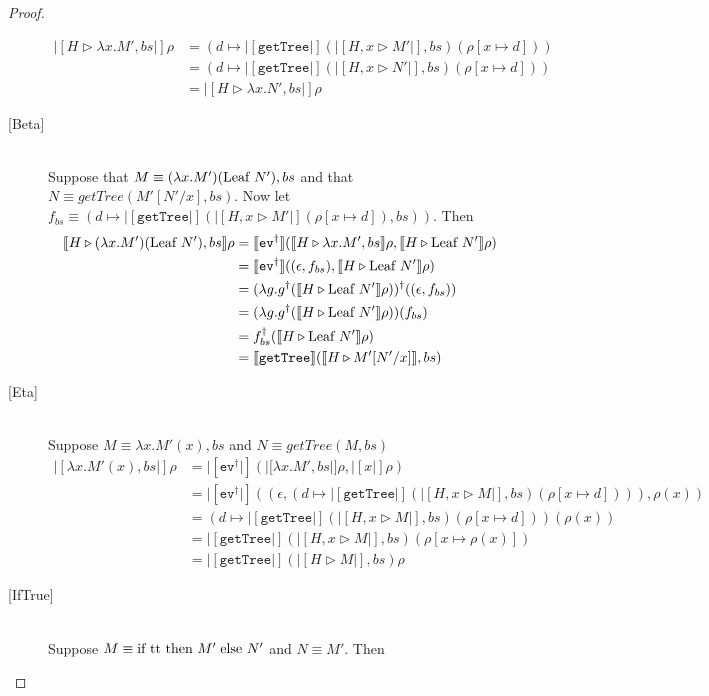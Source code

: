 \begin{proof}
\begin{description}
\begin{align*}
|[H\triangleright \lambda x.M', bs|]\rho &= 
(d\mapsto |[\texttt{getTree}|](|[H,x\triangleright M'|], bs)
(\rho[x\mapsto d])) \\
&= (d\mapsto |[\texttt{getTree}|](|[H,x\triangleright N'|], bs)
(\rho[x\mapsto d])) \\
&= |[H\triangleright \lambda x.N', bs|]\rho
\end{align*}
\item[{[}Beta{]}] \hfill \\ 
Suppose that $M\equiv (\lambda x.M')(\textrm{Leaf } N'), bs$ and that 
$N\equiv getTree(M'[N'/x],bs)$.  Now let ${f_{bs}\equiv (d\mapsto |[\texttt{getTree}|](|[H,x\triangleright M'|](\rho[x\mapsto d]), bs))}$.  Then
\begin{align*}
|[H\triangleright (\lambda x.M')(\textrm{Leaf } N'),bs|]\rho &= 
|[\texttt{ev}^\dagger|](|[H\triangleright \lambda x.M', bs|]\rho, 
|[H\triangleright \textrm{Leaf } N'|]\rho) \\
&= |[\texttt{ev}^\dagger|]((\epsilon, f_{bs}), 
|[H\triangleright \textrm{Leaf } N'|]\rho) \\
&= (\lambda g.g^{\dagger}(|[H\triangleright \textrm{Leaf } N'|]\rho))^{\dagger}
((\epsilon, f_{bs})) \\
&= (\lambda g.g^{\dagger}(|[H\triangleright \textrm{Leaf } N'|]\rho))
(f_{bs}) \\
&= f_{bs}^{\dagger}
(|[H\triangleright \textrm{Leaf } N'|]\rho) \\
&= |[\texttt{getTree}|](|[H\triangleright M'[N'/x]|], bs)
\end{align*}
\item[{[}Eta{]}] \hfill \\ 
Suppose $M\equiv \lambda x.M'(x), bs$ and 
$N\equiv getTree(M, bs)$
\begin{align*}
|[\lambda x.M'(x), bs|]\rho &= 
|[\texttt{ev}^{\dagger}|](|[\lambda x.M', bs|]\rho, |[x|]\rho) \\
&= |[\texttt{ev}^{\dagger}|]
((\epsilon, (d\mapsto |[\texttt{getTree}|](|[H,x\triangleright M|], bs)(\rho[x\mapsto d]))), \rho(x)) \\
&= (d\mapsto |[\texttt{getTree}|](|[H,x\triangleright M|], bs)(\rho[x\mapsto d]))(\rho(x)) \\
&= |[\texttt{getTree}|](|[H,x\triangleright M|], bs)
(\rho[x\mapsto \rho(x)]) \\
&= |[\texttt{getTree}|](|[H\triangleright M|], bs)\rho 
\end{align*}
\item[{[}IfTrue{]}] \hfill \\ 
Suppose $M\equiv \textrm{if }\textrm{tt }\textrm{then } M'\;\textrm{else } N'$ and $N\equiv M'$.  Then

\end{description}
\end{proof}
